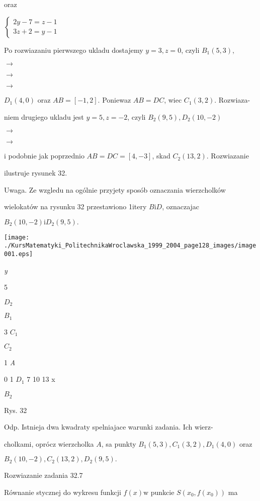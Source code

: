 \documentclass[a4paper,12pt]{article}
\begin{document}
oraz

$\left\{\begin{array}{l}
2y-7=z-1\\
3z+2=y-1
\end{array}\right.$

Po rozwiazaniu pierwszego ukladu dostajemy $y=3, z=0$, czyli $B_{1}(5,3),$

$\rightarrow$

$\rightarrow$

$\rightarrow$

$D_{1}(4,0)$ oraz $AB= [-1,2]$. Poniewaz $AB=DC$, wiec $C_{1}(3,2)$. Rozwiaza-

niem drugiego ukladu jest $y = 5, z = -2$, czyli $B_{2}(9,5), D_{2}(10,-2)$

$\rightarrow$

$\rightarrow$

$\mathrm{i}$ podobnie jak poprzednio $AB=DC=[4,-3]$, skad $C_{2}(13,2)$. Rozwiazanie

ilustruje rysunek 32.

Uwaga. Ze wzgledu na ogólnie przyjety sposób oznaczania wierzcholków

wielokatów na rysunku 32 przestawiono 1itery $B \mathrm{i} D$, oznaczajac

$B_{2}(10,-2)\mathrm{i}D_{2}(9,5).$
\begin{center}
\texttt{[image: ./KursMatematyki\_PolitechnikaWroclawska\_1999\_2004\_page128\_images/image001.eps]}
\end{center}
{\it y}

5

$D_{2}$

$B_{1}$

3  $C_{1}$

$C_{2}$

1  {\it A}

0 1  $D_{1}$  7  10  13 x

$B_{2}$

Rys. 32

Odp. Istnieja dwa kwadraty spelniajace warunki zadania. Ich wierz-

cholkami, oprócz wierzcholka $A$, sa punkty $B_{1}(5,3), C_{1}(3,2), D_{1}(4,0)$ oraz

$B_{2}(10,-2), C_{2}(13,2), D_{2}(9,5).$

Rozwiazanie zadania 32.7

Równanie stycznej do wykresu funkcji $f(x)\mathrm{w}$ punkcie $S(x_{0},f(x_{0}))$ ma
\end{document}
